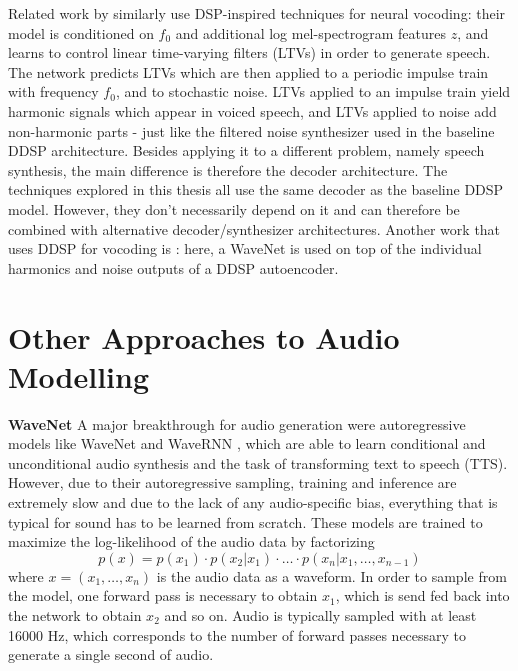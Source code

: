 Related work by \citet{liu_neural_2020} similarly use DSP-inspired techniques for neural vocoding: their model is conditioned on $f_0$ and additional log mel-spectrogram features $z$, and learns to control linear time-varying filters (LTVs) in order to generate speech.
The network predicts LTVs which are then applied to a periodic impulse train with frequency $f_0$, and to stochastic noise. LTVs applied to an impulse train yield harmonic signals which appear in voiced speech, and LTVs applied to noise add non-harmonic parts - just like the filtered noise synthesizer used in the baseline DDSP architecture.
Besides applying it to a different problem, namely speech synthesis, the main difference is therefore the decoder architecture.
The techniques explored in this thesis all use the same decoder as the baseline DDSP model. However, they don't necessarily depend on it and can therefore be combined with alternative decoder/synthesizer architectures. \newline
Another work that uses DDSP for vocoding is \citet{mccarthy_hooligan_2020}: here, a WaveNet is used on top of the individual harmonics and noise outputs of a DDSP autoencoder.


\section{Other Approaches to Audio Modelling}
\textbf{WaveNet} A major breakthrough for audio generation were autoregressive models like WaveNet \citep{WaveNet} and WaveRNN \citep{kalchbrenner_efficient_2018}, which are able to learn conditional and unconditional audio synthesis and the task of transforming text to speech (TTS).
However, due to their autoregressive sampling, training and inference are extremely slow and due to the lack of any audio-specific bias, everything that is typical for sound has to be learned from scratch.
These models are trained to maximize the log-likelihood of the audio data by factorizing
\begin{equation}
    p(x) = p(x_1) \cdot p(x_2|x_1) \cdot \dots \cdot p(x_n|x_1, \dots , x_{n-1})
\end{equation}
where $x = (x_1, \dots, x_n)$ is the audio data as a waveform.
In order to sample from the model, one forward pass is necessary to obtain $x_1$, which is send fed back into the network to obtain $x_2$ and so on. Audio is typically sampled with at least 16000 Hz, which corresponds to the number of forward passes necessary to generate a single second of audio.

